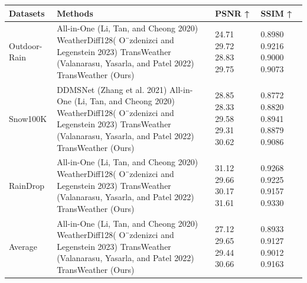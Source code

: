 \begin{tabular}{llll}
\toprule
Datasets & Methods & PSNR ↑ & SSIM ↑ \\
\midrule
Outdoor-Rain & All-in-One (Li, Tan, and Cheong 2020) WeatherDiff128( O¨zdenizci and Legenstein 2023) TransWeather (Valanarasu, Yasarla, and Patel 2022) TransWeather (Ours) & 24.71 29.72 28.83 29.75 & 0.8980 0.9216 0.9000 0.9073 \\
Snow100K & DDMSNet (Zhang et al. 2021) All-in-One (Li, Tan, and Cheong 2020) WeatherDiff128( O¨zdenizci and Legenstein 2023) TransWeather (Valanarasu, Yasarla, and Patel 2022) TransWeather (Ours) & 28.85 28.33 29.58 29.31 30.62 & 0.8772 0.8820 0.8941 0.8879 0.9086 \\
RainDrop & All-in-One (Li, Tan, and Cheong 2020) WeatherDiff128( O¨zdenizci and Legenstein 2023) TransWeather (Valanarasu, Yasarla, and Patel 2022) TransWeather (Ours) & 31.12 29.66 30.17 31.61 & 0.9268 0.9225 0.9157 0.9330 \\
Average & All-in-One (Li, Tan, and Cheong 2020) WeatherDiff128( O¨zdenizci and Legenstein 2023) TransWeather (Valanarasu, Yasarla, and Patel 2022) TransWeather (Ours) & 27.12 29.65 29.44 30.66 & 0.8933 0.9127 0.9012 0.9163 \\
\bottomrule
\end{tabular}
